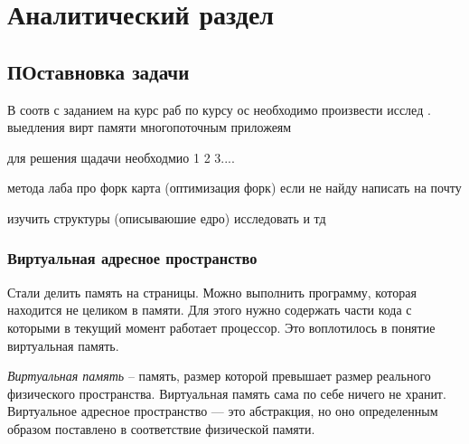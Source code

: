 
\chapter{Аналитический раздел}
\label{cha:analysis}

\section{ПОставновка задачи}

В соотв с заданием  на курс раб по курсу ос необходимо произвести исслед . выедления вирт памяти
многопоточным приложеям 

для решения щадачи необходмио 1 2 3....

метода лаба про форк карта (оптимизация форк) если не найду написать на почту 

изучить структуры (описываюшие едро) 
исследовать и тд



\subsection{Виртуальная адресное пространство}

Стали делить память на страницы. Можно выполнить программу, которая находится не целиком в памяти. 
Для этого нужно содержать части кода с которыми в текущий момент работает процессор.
Это воплотилось в понятие виртуальная память.

\textit{Виртуальная память} – память, размер которой превышает размер реального физического пространства.
Виртуальная память сама по себе ничего не хранит. 
Виртуальное адресное пространство — это абстракция, но оно определенным образом поставлено в соответствие физической памяти.

